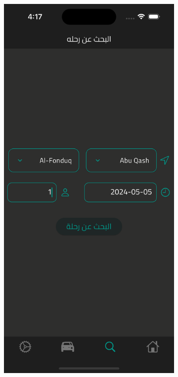 \documentclass[a4paper, 12pt]{report} %
\begin{document}
            \begin{figure}[H]
                \centering
                \begin{subfigure}{0.31\textwidth}
                    \includegraphics[width=\linewidth]{Images/trip_search_1.png}

\end{subfigure}
\end{figure}
\end{document}
